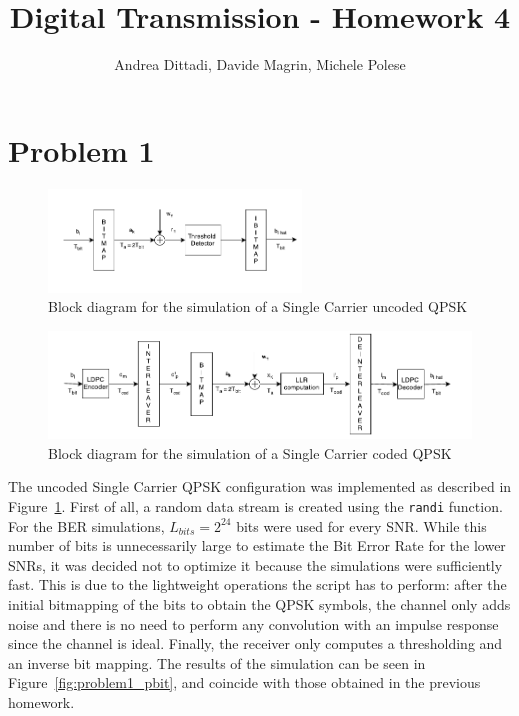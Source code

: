 \documentclass[10pt]{article}
\begin{document}
\title{Digital Transmission - Homework 4}
\author{Andrea Dittadi, Davide Magrin, Michele Polese}

\maketitle


\section*{Problem 1}


\begin{figure}
	\centering
	\includegraphics[width = 0.6\textwidth]{SC_uncoded}
	\caption{Block diagram for the simulation of a Single Carrier uncoded QPSK}
	\label{fig:problem1_scuncoded}
\end{figure}

\begin{figure}
	\centering
	\includegraphics[width = \textwidth]{SC_coded}
	\caption{Block diagram for the simulation of a Single Carrier coded QPSK}
	\label{fig:problem1_sccoded}
\end{figure}

The uncoded Single Carrier QPSK configuration was implemented as described in Figure~\ref{fig:problem1_scuncoded}. First of all, a random data stream is created using the \texttt{randi} function. For the BER simulations, $L_{bits} = 2^{24}$ bits were used for every SNR. While this number of bits is unnecessarily large to estimate the Bit Error Rate for the lower SNRs, it was decided not to optimize it because the simulations were sufficiently fast. This is due to the lightweight operations the script has to perform: after the initial bitmapping of the bits to obtain the QPSK symbols, the channel only adds noise and there is no need to perform any convolution with an impulse response since the channel is ideal. Finally, the receiver only computes a thresholding and an inverse bit mapping. The results of the simulation can be seen in Figure~\ref{fig:problem1_pbit}, and coincide with those obtained in the previous homework. %
\end{document}
